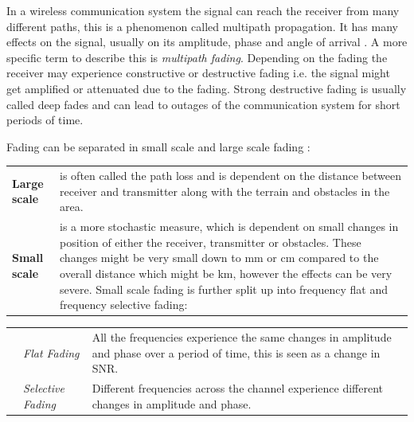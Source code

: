 In a wireless communication system the signal can reach the receiver from many different paths, this is a phenomenon called multipath propagation. It has many effects on the signal, usually on its amplitude, phase and angle of arrival \citep{Fading}. A more specific term to describe this is \textit{multipath fading}. Depending on the fading the receiver may experience constructive or destructive fading i.e. the signal might get amplified or attenuated due to the fading. Strong destructive fading is usually called deep fades and can lead to outages of the communication system for short periods of time. 

Fading can be separated in  small scale and large scale fading \citep{FlatSelective}: 

\begin{tabular}{lp{13.1cm}}
\textbf{Large scale} & is often called the path loss and is dependent on the distance between receiver and transmitter along with the terrain and obstacles in the area. \\ 
\textbf{Small scale} & is a more stochastic measure, which is dependent on small changes in position of either the receiver, transmitter or obstacles. These changes might be very small down to mm or cm compared to the overall distance which might be km, however the effects can be very severe. Small scale fading is further split up into frequency flat and frequency selective fading:
\end{tabular}
\begin{tabular}{p{0.3cm}lp{11.7cm}}
&\textit{Flat Fading} & All the frequencies experience the same changes in amplitude and phase over a period of time, this is seen as a change in SNR.\\
&\textit{Selective Fading} & Different frequencies across the channel experience different changes in amplitude and phase. 
\end{tabular}




